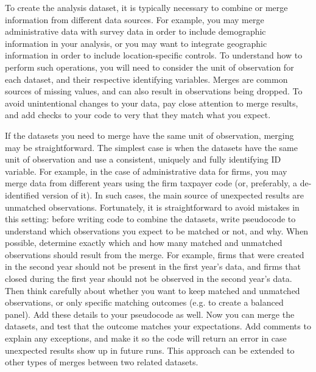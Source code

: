 To create the analysis dataset,
it is typically necessary to combine or merge information from different data sources.
For example, you may merge administrative data with survey data
in order to include demographic information in your analysis,
or you may want to integrate geographic information
in order to include location-specific controls.
To understand how to perform such operations, 
you will need to consider the unit of observation for each dataset,
and their respective identifying variables.
Merges are common sources of missing values,
and can also result in observations being dropped.
To avoid unintentional changes to your data,
pay close attention to merge results,
and add checks to your code to very that they match what you expect.

If the datasets you need to merge have the same unit of observation,
merging may be straightforward.
The simplest case is when the datasets have the same unit of observation
and use a consistent, uniquely and fully identifying ID variable. 
For example, in the case of administrative data for firms,
you may merge data from different years using the firm taxpayer code
(or, preferably, a de-identified version of it).
In such cases, the main source of unexpected results are unmatched observations.
Fortunately, it is straightforward to avoid mistakes in this setting:
before writing code to combine the datasets,
write pseudocode to understand which observations you expect to be
matched or not, and why.
When possible, determine exactly which and how many 
matched and unmatched observations should result from the merge.
For example, firms that were created in the second year should not be
present in the first year's data, 
and firms that closed during the first year should not be observed in the second year's data. 
Then think carefully about whether you want to keep matched and unmatched
observations, or only specific matching outcomes (e.g. to create a balanced panel).
Add these details to your pseudocode as well.
Now you can merge the datasets, 
and test that the outcome matches your expectations.
Add comments to explain any exceptions, 
and make it so the code will return an error in case unexpected results show up in future runs.
This approach can be extended to other types of merges between two related datasets.

